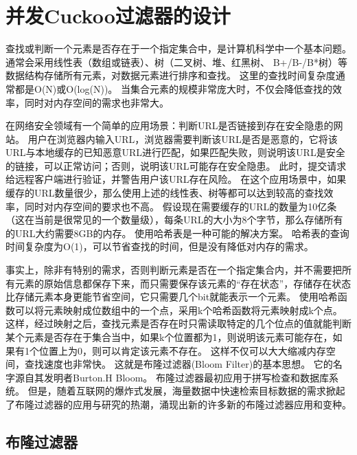 \chapter{并发Cuckoo过滤器的设计}
查找或判断一个元素是否存在于一个指定集合中，是计算机科学中一个基本问题。
通常会采用线性表（数组或链表）、树（二叉树、堆、红黑树、 B+/B-/B*树）等数据结构存储所有元素，对数据元素进行排序和查找。
这里的查找时间复杂度通常都是O(N)或O(log(N))。
当集合元素的规模非常庞大时，不仅会降低查找的效率，同时对内存空间的需求也非常大。

在网络安全领域有一个简单的应用场景：判断URL是否链接到存在安全隐患的网站。
用户在浏览器内输入URL，浏览器需要判断该URL是否是恶意的，它将该URL与本地缓存的已知恶意URL进行匹配，如果匹配失败，则说明该URL是安全的链接，可以正常访问；否则，说明该URL可能存在安全隐患。
此时，提交请求给远程客户端进行验证，并警告用户该URL存在风险。
在这个应用场景中，如果缓存的URL数量很少，那么使用上述的线性表、树等都可以达到较高的查找效率，同时对内存空间的要求也不高。
假设现在需要缓存的URL的数量为10亿条（这在当前是很常见的一个数量级），每条URL的大小为8个字节，那么存储所有的URL大约需要8GB的内存。
使用哈希表是一种可能的解决方案。
哈希表的查询时间复杂度为O(1)，可以节省查找的时间，但是没有降低对内存的需求。

事实上，除非有特别的需求，否则判断元素是否在一个指定集合内，并不需要把所有元素的原始信息都保存下来，而只需要保存该元素的“存在状态”，存储存在状态比存储元素本身更能节省空间，它只需要几个bit就能表示一个元素。
使用哈希函数可以将元素映射成位数组中的一个点，采用k个哈希函数将元素映射成k个点。
这样，经过映射之后，查找元素是否存在时只需读取特定的几个位点的值就能判断某个元素是否存在于集合当中，如果k个位置都为1，则说明该元素可能存在，如果有1个位置上为0，则可以肯定该元素不存在。
这样不仅可以大大缩减内存空间，查找速度也非常快。
这就是布隆过滤器(Bloom Filter)的基本思想。
它的名字源自其发明者Burton.H Bloom\cite{bloom1970space}。
布隆过滤器最初应用于拼写检查和数据库系统。
但是，随着互联网的爆炸式发展，海量数据中快速检索目标数据的需求掀起了布隆过滤器的应用与研究的热潮，涌现出新的许多新的布隆过滤器应用和变种\cite{song2005fast,bonomi2006improved,yu2009buffalo,bender2012don}。

\section{布隆过滤器}

